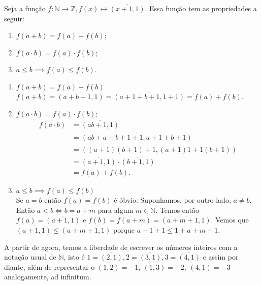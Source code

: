 \documentclass[../main.tex]{subfiles}
\begin{document}
\begin{teo}\label{int-teo-imersao}
    Seja a função $f: \mathbb{N} \rightarrow \mathbb{Z}, f(x) \mapsto \overline{(x+1, 1)}$. Essa função tem as propriedades a seguir:
    \begin{enumerate}[label=(\roman*)]
        \item $f(a + b) = f(a) + f(b)$;
        \item $f(a \cdot b) = f(a) \cdot f(b)$;
        \item $a \leq b \implies f(a) \leq f(b)$.
    \end{enumerate}
\end{teo}
\begin{dem}
    \begin{enumerate}[label=(\roman*)]
        \item $f(a + b) = f(a) + f(b)$\\
        
            $f(a + b) = \overline{(a+b+1, 1)}
                     = \overline{(a+1+b+1, 1+1)} 
                     = f(a) + f(b)$.
        
    
        \item $f(a \cdot b) = f(a) \cdot f(b)$;
        \begin{align*}
            f(a \cdot b) &= \overline{(ab+1, 1)}\\
                        &= \overline{(ab+a+b+1+1, a+1+b+1)}\\
                        &= \overline{((a+1)(b+1)+1, (a+1)1 + 1(b+1))}\\
                        &= \overline{(a+1,1)} \cdot \overline{(b+1,1)}\\
                        &= f(a) + f(b).
        \end{align*}        
        
        \item $a \leq b \implies f(a) \leq f(b)$ \\
        Se $a=b$ então $f(a)=f(b)$ é óbvio. Suponhamos, por outro lado, $a \neq b$.
        Então $a<b \iff b=a+m$ para algum $m \in \mathbb{N}$.
        Temos então $f(a) = \overline{(a+1,1)}$ e $f(b) = f(a+m) = \overline{(a+m+1,1)}$.
        Vemos que $\overline{(a+1,1)} \leq \overline{(a+m+1,1)}$ porque $a+1+1 \leq 1 + a + m + 1$.
    \end{enumerate}
\end{dem}
\begin{obs}
    A partir de agora, temos a liberdade de escrever os números inteiros com a notação usual de $\mathbb{N}$, isto é $1 = \overline{(2,1)}, 2 = \overline{(3,1)}, 3 = \overline{(4,1)}$ e assim por diante, além de representar o $\overline{(1,2)} = -1,\ \overline{(1,3)} = -2,\ \overline{(4,1)} = -3$ analogamente, ad infinitum.
\end{obs}
\end{document}
